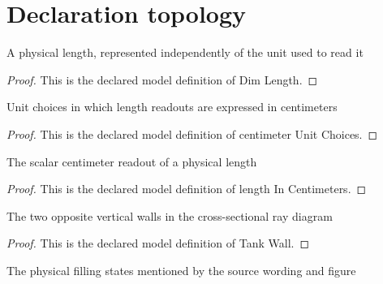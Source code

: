 \section{Declaration topology}
\begin{definition}
  \label{def:physics:phyx-mini-0071:phyxminiproblems-problemphyxmini0071-dimlength}
  A physical length, represented independently of the unit used to read it
\end{definition}
\begin{proof}
  This is the declared model definition of Dim Length.
\end{proof}
\begin{definition}
  \label{def:physics:phyx-mini-0071:phyxminiproblems-problemphyxmini0071-centimeterunitchoices}
  Unit choices in which length readouts are expressed in centimeters
\end{definition}
\begin{proof}
  This is the declared model definition of centimeter Unit Choices.
\end{proof}
\begin{definition}
  \label{def:physics:phyx-mini-0071:phyxminiproblems-problemphyxmini0071-lengthincentimeters}
  The scalar centimeter readout of a physical length
\end{definition}
\begin{proof}
  This is the declared model definition of length In Centimeters.
\end{proof}
\begin{definition}
  \label{def:physics:phyx-mini-0071:phyxminiproblems-problemphyxmini0071-tankwall}
  The two opposite vertical walls in the cross-sectional ray diagram
\end{definition}
\begin{proof}
  This is the declared model definition of Tank Wall.
\end{proof}
\begin{definition}
  \label{def:physics:phyx-mini-0071:phyxminiproblems-problemphyxmini0071-tankcontents}
  The physical filling states mentioned by the source wording and figure
\end{definition}
